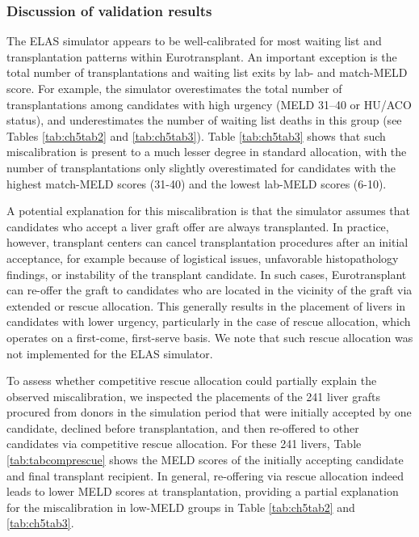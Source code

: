 \documentclass[11pt,twoside,]{book}
\begin{document}
\FloatBarrier

\subsubsection{Discussion of validation results}\label{sec:valelasdiscussion}

The ELAS simulator appears to be well-calibrated for most waiting list
and transplantation patterns within Eurotransplant. An important
exception is the total number of transplantations and waiting list exits
by lab- and match-MELD score. For example, the simulator overestimates
the total number of transplantations among candidates with high urgency
(MELD 31--40 or HU/ACO status), and underestimates the number of waiting list
deaths in this group (see Tables \ref{tab:ch5tab2} and \ref{tab:ch5tab3}).
Table \ref{tab:ch5tab3} shows that such miscalibration is present to a much
lesser degree in standard allocation, with the number of transplantations only
slightly overestimated for candidates with the highest match-MELD scores (31-40)
and the lowest lab-MELD scores (6-10).

A potential explanation for this miscalibration is that the simulator
assumes that candidates who accept a liver graft offer are always transplanted.
In practice, however, transplant centers can cancel transplantation
procedures after an initial acceptance, for example because of logistical
issues, unfavorable histopathology findings, or instability of the
transplant candidate. In such cases, Eurotransplant can re-offer
the graft to candidates who are located in the
vicinity of the graft via extended or rescue allocation. This generally
results in the placement of livers in candidates with lower urgency,
particularly in the case of rescue allocation, which operates on a first-come,
first-serve basis. We note that such rescue
allocation was not implemented for the ELAS simulator.

To assess whether competitive rescue allocation could partially explain the observed
miscalibration, we inspected the placements of the 241 liver grafts procured from
donors in the simulation period that were initially accepted by one candidate, declined
before transplantation, and then re-offered to other candidates via competitive
rescue allocation. For these 241 livers, Table \ref{tab:tabcomprescue} shows the MELD scores of
the initially accepting candidate and final transplant recipient. In general,
re-offering via rescue allocation indeed leads
to lower MELD scores at transplantation, providing a partial explanation for the
miscalibration in low-MELD groups in Table \ref{tab:ch5tab2} and \ref{tab:ch5tab3}.
\end{document}
